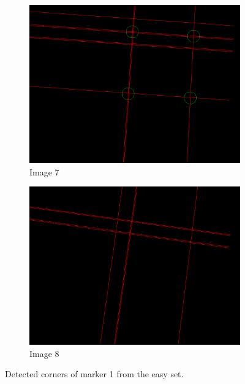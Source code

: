 \begin{figure}[H]
 \centering
 \begin{subfigure}{0.49\linewidth}
 \includegraphics[width=\linewidth]{graphics/Detected_points_marker1a_7}
 \caption{Image 7}
 \label{fig:crossing_points}
 \end{subfigure}
 \begin{subfigure}{0.49\linewidth}
 \includegraphics[width=\linewidth]{graphics/Detected_points_marker1a_8}
 \caption{Image 8}
 \end{subfigure}
 \caption{Detected corners of marker 1 from the easy set.}
 \label{fig:crossing_points_marker}
\end{figure}
